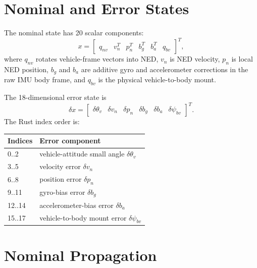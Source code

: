 \documentclass[11pt]{article}
\newcommand{\T}{^{T}}
\begin{document}
\section{Nominal and Error States}

The nominal state has 20 scalar components:
\begin{equation}
  x=
  \begin{bmatrix}
  q_{nv} & v_n\T & p_n\T & b_g\T & b_a\T & q_{bv}
\end{bmatrix}\T ,
\end{equation}
where \(q_{nv}\) rotates vehicle-frame vectors into NED, \(v_n\) is NED
velocity, \(p_n\) is local NED position, \(b_g\) and \(b_a\) are additive gyro
and accelerometer corrections in the raw IMU body frame, and \(q_{bv}\) is the
physical vehicle-to-body mount.

The 18-dimensional error state is
\begin{equation}
  \delta x =
  \begin{bmatrix}
  \delta\theta_v &
  \delta v_n &
  \delta p_n &
  \delta b_g &
  \delta b_a &
  \delta\psi_{bv}
  \end{bmatrix}\T .
\end{equation}
The Rust index order is:
\begin{center}
\begin{tabular}{ll}
\toprule
Indices & Error component \\
\midrule
0..2 & vehicle-attitude small angle \(\delta\theta_v\) \\
3..5 & velocity error \(\delta v_n\) \\
6..8 & position error \(\delta p_n\) \\
9..11 & gyro-bias error \(\delta b_g\) \\
12..14 & accelerometer-bias error \(\delta b_a\) \\
15..17 & vehicle-to-body mount error \(\delta\psi_{bv}\) \\
\bottomrule
\end{tabular}
\end{center}

\section{Nominal Propagation}
\end{document}
